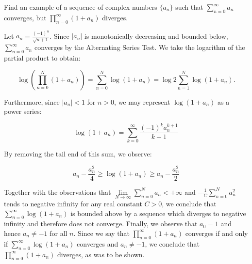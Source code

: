 Find an example of a sequence of complex numbers $\{a_n\}$ such that $\sum\limits_{n=0}^{\infty} a_n$ converges, but 
\linebreak $\prod\limits_{n=0}^{\infty} (1 + a_n)$ diverges.

\begin{solution}
  Let $a_n = \frac{(-1)^n}{\sqrt{n+1}}$. Since $|a_n|$ is monotonically decreasing and bounded below, 
  $\sum\limits_{n=0}^{\infty} a_n$ converges by the Alternating Series Test. We take the logarithm of the partial 
  product to obtain:

  $$
  \log \left( \prod_{n=0}^{N} (1 + a_n) \right) 
    = \sum_{n=0}^{N} \log(1 + a_n) 
    = \log 2 \sum_{n=1}^{N} \log(1 + a_n).
  $$

  Furthermore, since $|a_n| < 1$ for $n > 0$, we may represent $\log(1 + a_n)$ as a power series:

  $$
  \log{(1 + a_n)} = \sum_{k=0}^{\infty} \frac{(-1)^k a_n^{k+1}}{k+1}
  $$

  By removing the tail end of this sum, we observe:

  $$
  a_n - \frac{a_n^2}{4} \ge \log(1 + a_n) \ge a_n - \frac{a_n^2}{2}
  $$

  Together with the observations that $\lim\limits_{N \to \infty} \sum\limits_{n=0}^{N} a_n < +\infty$ and 
  $-\frac{1}{C} \sum\limits_{n=0}^{N} a_n^2$ tends to negative infinity for any real constant $C > 0$, we conclude
  that $\sum\limits_{n=0}^{\infty} \log(1 + a_n)$ is bounded above by a sequence which diverges to negative infinity
  and therefore does not converge. Finally, we observe that $a_0 = 1$ and hence $a_n \neq -1$ for all $n$. Since we say 
  that $\prod\limits_{n=0}^{\infty} (1 + a_n)$ converges if and only if $\sum\limits_{n=0}^{\infty} \log(1 + a_n)$ 
  converges and $a_n \neq -1$, we conclude that $\prod\limits_{n=0}^{\infty} (1 + a_n)$ diverges, as was to be shown.
  \ \\
\end{solution}